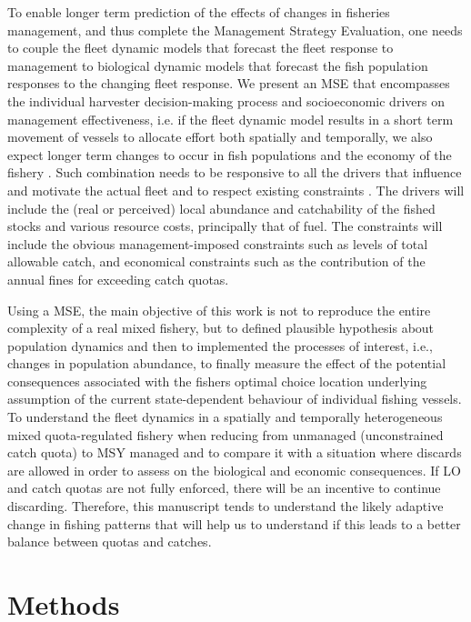 \documentclass[12pt,oneline,a4paper,numbib]{ouparticle}
\numberwithin{equation}{subsection} %
\begin{document}
To enable longer term prediction of the effects of changes in fisheries management, and thus complete the Management Strategy Evaluation, one needs to couple the fleet dynamic models that forecast the fleet response to management to  biological dynamic models that forecast the fish population responses to the changing fleet response. We present an MSE that encompasses the individual harvester decision-making process and socioeconomic drivers on management effectiveness, i.e. if the fleet dynamic model results in a short term movement of vessels to allocate effort both spatially and temporally, we also expect longer term changes to occur in fish populations and the economy of the fishery \cite{Alzorriz2018}. Such combination needs to be responsive to all the drivers that influence and motivate the actual fleet and to respect existing constraints \cite{Venables2009}. The drivers will include the (real or perceived) local abundance and catchability of the fished stocks and various resource costs, principally that of fuel. The constraints will include the obvious management-imposed constraints such as levels of total allowable catch, and economical constraints such as the contribution of the annual fines for exceeding catch quotas.

Using a MSE, the main objective of this work is not to reproduce the entire complexity of a real mixed fishery, but to defined plausible hypothesis about population dynamics and then to implemented the processes of interest, i.e., changes in population abundance, to finally measure the effect of the potential consequences associated with the fishers optimal choice location underlying assumption of the current state-dependent behaviour of individual fishing vessels. To understand the fleet dynamics in a spatially and temporally heterogeneous mixed quota-regulated fishery when reducing from unmanaged (unconstrained catch quota) to MSY managed and to compare it with a situation where discards are allowed in order to assess on the biological and economic consequences. If LO and catch quotas are not fully enforced, there will be an incentive to continue discarding. Therefore, this manuscript tends to understand the likely adaptive change in fishing patterns that will help us to understand if this leads to a better balance between quotas and catches.



\section{Methods}
\label{sec2}
\end{document}

